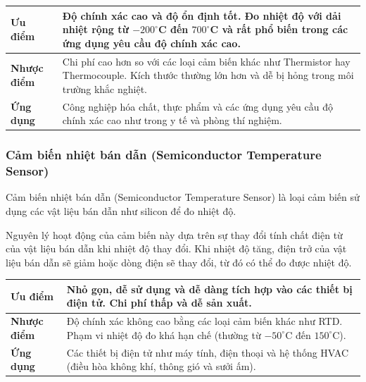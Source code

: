 \documentclass[../DoAn.tex]{subfiles}
\begin{document}
\begin{table}[htbp]
\centering
\begin{tabular}{|p{3cm}|p{10cm}|}
\hline
\textbf{Ưu điểm} &
  Độ chính xác cao và độ ổn định tốt.
  Đo nhiệt độ với dải nhiệt rộng từ $-200^\circ$C đến $700^\circ$C và rất phổ biến trong các ứng dụng yêu cầu độ chính xác cao.
\\ \hline

\textbf{Nhược điểm} &
  Chi phí cao hơn so với các loại cảm biến khác như Thermistor hay Thermocouple.
  Kích thước thường lớn hơn và dễ bị hỏng trong môi trường khắc nghiệt.
\\ \hline

\textbf{Ứng dụng} &
Công nghiệp hóa chất, thực phẩm và các ứng dụng yêu cầu độ chính xác cao như trong y tế và phòng thí nghiệm.
\\ \hline
\end{tabular}
\end{table}

\subsubsection{Cảm biến nhiệt bán dẫn (Semiconductor Temperature Sensor)}

Cảm biến nhiệt bán dẫn (Semiconductor Temperature Sensor) là loại cảm biến sử dụng các vật liệu bán dẫn như silicon để đo nhiệt độ.

Nguyên lý hoạt động của cảm biến này dựa trên sự thay đổi tính chất điện từ của vật liệu bán dẫn khi nhiệt độ thay đổi. Khi nhiệt độ tăng, điện trở của vật liệu bán dẫn sẽ giảm hoặc dòng điện sẽ thay đổi, từ đó có thể đo được nhiệt độ.

\begin{table}[H]
\centering
\begin{tabular}{|p{3cm}|p{10cm}|}
\hline
\textbf{Ưu điểm} &
  Nhỏ gọn, dễ sử dụng và dễ dàng tích hợp vào các thiết bị điện tử.
  Chi phí thấp và dễ sản xuất.
\\ \hline

\textbf{Nhược điểm} &
  Độ chính xác không cao bằng các loại cảm biến khác như RTD.
  Phạm vi nhiệt độ đo khá hạn chế (thường từ $-50^\circ$C đến $150^\circ$C).
\\ \hline

\textbf{Ứng dụng} &
Các thiết bị điện tử như máy tính, điện thoại và hệ thống HVAC (điều hòa không khí, thông gió và sưởi ấm).
\\ \hline
\end{tabular}
\end{table}
\end{document}
